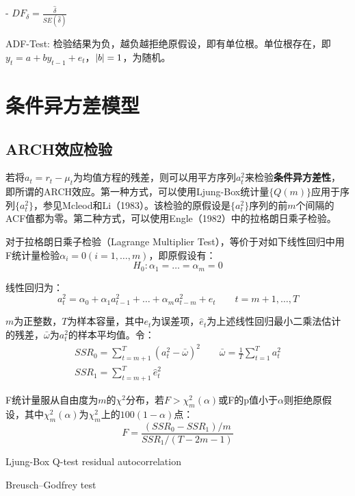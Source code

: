 \documentclass[11pt]{article}
\begin{document}
-  $DF_{\delta} = \frac{\hat{\delta}}{SE(\hat{\delta})}$

ADF-Test: 检验结果为负，越负越拒绝原假设，即有单位根。单位根存在，即$y_t = a + b y_{t-1} + e_t$，$\left\lvert b\right\rvert =1$，为随机。

\section{条件异方差模型}

\subsection{ARCH效应检验}

若将$a_t = r_t - \mu_t$为均值方程的残差，则可以用平方序列$a_t^2$来检验\textbf{条件异方差性}，即所谓的ARCH效应。第一种方式，可以使用Ljung-Box统计量$\{Q(m)\}$应用于序列$\{a_t^2\}$，参见Mcleod和Li（1983）。该检验的原假设是$\{a_t^2\}$序列的前$m$个间隔的ACF值都为零。第二种方式，可以使用Engle（1982）中的拉格朗日乘子检验。

对于拉格朗日乘子检验（Lagrange Multiplier Test），等价于对如下线性回归中用F统计量检验$\alpha_i=0(i=1,\dots,m)$，即原假设有：
\begin{equation*}
    H_0: \alpha_1 = \dots = \alpha_m = 0
\end{equation*}

线性回归为：
\begin{equation*}
    a^2_t = \alpha_0 + \alpha_1 a^{2}_{t-1} + \dots + \alpha_m a^{2}_{t-m} + e_t \qquad t=m+1,\dots,T
\end{equation*}

$m$为正整数，$T$为样本容量，其中$e_t$为误差项，$\hat{e}_t$为上述线性回归最小二乘法估计的残差，$\bar{\omega}$为$a_t^2$的样本平均值。令：
\begin{gather*}
    SSR_0 = \sum_{t=m+1}^{T} (a_t^2 - \bar{\omega})^2 \qquad
    \bar{\omega} = \frac{1}{T} \sum_{t=1}^{T} a_t^2 \\
    SSR_1 = \sum_{t=m+1}^{T} \hat{e}_t^2
\end{gather*}

F统计量服从自由度为$m$的$\chi^2$分布，若$F>\chi_m^2(\alpha)$或F的p值小于$\alpha$则拒绝原假设，其中$\chi_m^2(\alpha)$为$\chi_m^2$上的$100(1-\alpha)$点：
\begin{equation*}
    F = \frac{(SSR_0-SSR_1)/m}{SSR_1/(T-2m-1)}
\end{equation*}

Ljung-Box Q-test
residual autocorrelation

Breusch–Godfrey test
\end{document}
